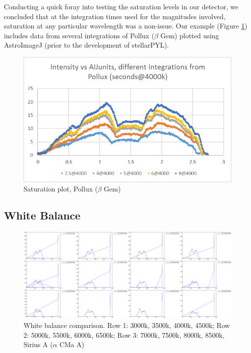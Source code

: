 \documentclass[prb,preprint]{revtex4-1}
\begin{document}
	Conducting a quick foray into testing the saturation levels in our detector, we concluded that at the integration times used for the magnitudes involved, saturation at any particular wavelength was a non-issue. Our example (Figure \ref{fig:1}) includes data from several integrations of Pollux ($\beta$ Gem) plotted using AstroImageJ (prior to the development of stellarPYL).

	\begin{figure}[!h]
		\includegraphics{saturation}
		\caption{Saturation plot, Pollux ($\beta$ Gem)}\label{fig:1}
	\end{figure}

	\subsection{White Balance}

	\begin{figure}[!h]
		\includegraphics[keepaspectratio,scale=.132]{allLTR-UTD.jpg}
		\caption{White balance comparison. Row 1: 3000k, 3500k, 4000k, 4500k; Row 2: 5000k, 5500k, 6000k, 6500k; Row 3: 7000k, 7500k, 8000k, 8500k, Sirius A ($\alpha$ CMa A)}\label{fig:2}
	\end{figure}
\end{document}

